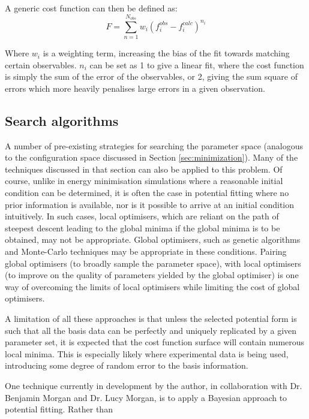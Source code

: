 A generic cost function can then be defined as:
\begin{equation}
	F = \sum_{n=1}^{N_{obs}}w_i(f_i^{obs} - f_i^{calc})^{n_i}
\end{equation}

Where $w_i$ is a weighting term, increasing the bias of the fit towards matching certain observables.
$n_i$ can be set as 1 to give a linear fit, where the cost function is simply the sum of the error of the observables, or 2, giving the sum square of errors which more heavily penalises large errors in a given observation.

\subsection{Search algorithms}
A number of pre-existing strategies for searching the parameter space (analogous to the configuration space discussed in Section \ref{sec:minimization}).
Many of the techniques discussed in that section can also be applied to this problem.
Of course, unlike in energy minimisation simulations where a reasonable initial condition can be determined, it is often the case in potential fitting where no prior information is available, nor is it possible to arrive at an initial condition intuitively.
In such cases, local optimisers, which are reliant on the path of steepest descent leading to the global minima if the global minima is to be obtained, may not be appropriate.
Global optimisers, such as genetic algorithms and Monte-Carlo techniques may be appropriate in these conditions.
Pairing global optimisers (to broadly sample the parameter space), with local optimisers (to improve on the quality of parameters yielded by the global optimiser) is one way of overcoming the limits of local optimisers while limiting the cost of global optimisers.

A limitation of all these approaches is that unless the selected potential form is such that all the basis data can be perfectly and uniquely replicated by a given parameter set, it is expected that the cost function surface will contain numerous local minima.
This is especially likely where experimental data is being used, introducing some degree of random error to the basis information.

One technique currently in development by the author, in collaboration with Dr. Benjamin Morgan and Dr. Lucy Morgan, is to apply a Bayesian approach to potential fitting.
Rather than 

